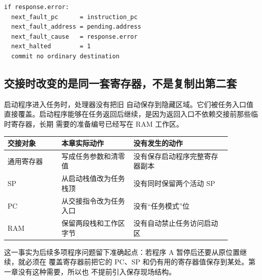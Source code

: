 \begin{lstlisting}
if response.error:
  next_fault_pc      = instruction_pc
  next_fault_address = pending.address
  next_fault_cause   = response.error
  next_halted        = 1
  commit no ordinary destination
\end{lstlisting}

\subsection{交接时改变的是同一套寄存器，不是复制出第二套}

启动程序进入任务时，处理器没有把旧  自动保存到隐藏区域。它们被任务入口值
直接覆盖。启动程序能够在任务返回后继续，是因为返回入口不依赖交接前那些临时寄存器，长期
需要的准备编号已经写在 RAM 工作区。

\begin{longtable}{|L{0.21\linewidth}|L{0.29\linewidth}|L{0.38\linewidth}|}
\hline
{}
交接对象 & 本章实际动作 & 没有发生的动作 \\ \hline
通用寄存器 & 写成任务参数和清零值 & 没有保存启动程序完整寄存器副本 \\ \hline
SP & 从启动栈值改为任务栈顶 & 没有同时保留两个活动 SP \\ \hline
PC & 从交接指令改为任务入口 & 没有“任务模式”位 \\ \hline
RAM & 保留两段栈和工作区字节 & 没有自动禁止任务访问启动区 \\ \hline
\end{longtable}

这一事实为后续多项程序问题留下准确起点：若程序 A 暂停后还要从原位置继续，就必须在
覆盖寄存器前把它的 PC、SP 和仍有用的寄存器值保存到某处。第一章没有这种需要，所以也
不提前引入保存现场结构。
